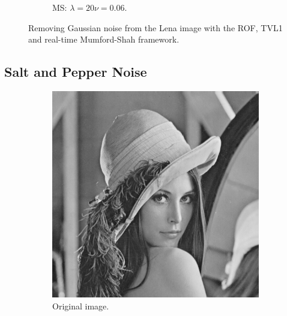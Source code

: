 \documentclass[abstracton]{scrreprt}
\begin{document}
\begin{figure}[!ht]
\begin{subfigure}[b]{0.244\textwidth}
                    \caption{MS: $\lambda = 20$\newline$\nu = 0.06$.}
                \end{subfigure}
                \caption[Removing Gaussian noise using the ROF, TVL1 and real-time Mumford-Shah framework.]{Removing Gaussian noise from the Lena image with the ROF, TVL1 and real-time Mumford-Shah framework.}
            \label{fig:denoising_lena_gauss}
            \end{figure}
        \subsection{Salt and Pepper Noise} %
        \label{sub:salt_and_pepper_noise}
            \begin{figure}[!ht]
                \centering
                \begin{subfigure}[b]{0.24\textwidth}
                    \includegraphics[width=\textwidth]{img/images/lena.png}
                    \caption{Original image.}
                \end{subfigure}
                \begin{subfigure}[b]{0.24\textwidth}

\end{subfigure}
\end{figure}
\end{document}
